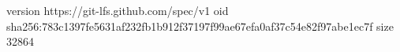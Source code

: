 version https://git-lfs.github.com/spec/v1
oid sha256:783c1397fe5631af232fb1b912f37197f99ae67efa0af37c54e82f97abe1ec7f
size 32864
